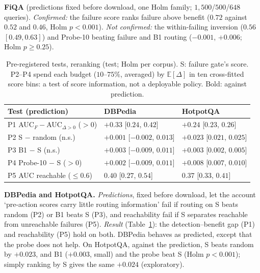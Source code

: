 \documentclass[sigconf,anonymous,review]{acmart}
\begin{document}
\textbf{FiQA} (predictions fixed before download, one Holm family;
$1{,}500$/$500$/$648$ queries). \emph{Confirmed:} the failure score
ranks failure above benefit ($0.72$ against $0.52$ and $0.46$, Holm
$p<0.001$). \emph{Not confirmed:} the within-failing inversion ($0.56$
$[0.49,0.63]$) and Probe-10 beating failure and B1 routing ($-0.001$,
$+0.006$; Holm $p\ge0.25$).

\begin{table}[t]
\caption{Pre-registered tests, reranking (test; Holm per corpus). S:
failure gate's score. P2--P4 spend each budget ($10$--$75\%$,
averaged) by $\mathbb{E}[\Delta]$ in ten cross-fitted score bins: a
test of score information, not a deployable policy. Bold: against
prediction.}
\label{tab:iv}
\footnotesize
\setlength{\tabcolsep}{3pt}
\begin{tabular}{@{}lll@{}}
\toprule
Test (prediction) & DBPedia & HotpotQA \\
\midrule
P1 AUC$_F-$AUC$_{\Delta>0}$ ($>0$) & $+0.33$ [$0.24$, $0.42$] & $+0.24$ [$0.23$, $0.26$] \\
P2 S $-$ random (n.s.) & $+0.001$ [$-0.002$, $0.013$] & $\mathbf{+0.023}$ [$0.021$, $0.025$] \\
P3 B1 $-$ S (n.s.) & $+0.003$ [$-0.009$, $0.011$] & $\mathbf{+0.003}$ [$0.002$, $0.005$] \\
P4 Probe-10 $-$ S ($>0$) & $\mathbf{+0.002}$ [$-0.009$, $0.011$] & $+0.008$ [$0.007$, $0.010$] \\
P5 AUC reachable ($\le0.6$) & $0.40$ [$0.27$, $0.54$] & $0.37$ [$0.33$, $0.41$] \\
\bottomrule
\end{tabular}
\end{table}

\textbf{DBPedia and HotpotQA.} \emph{Predictions}, fixed before
download, let the
account `pre-action scores carry little routing information' fail if
routing on S beats random (P2) or B1 beats S (P3), and reachability
fail if S separates reachable from unreachable failures (P5). \emph{Result} (Table~\ref{tab:iv}): the
detection--benefit gap (P1) and reachability (P5) hold on both.
DBPedia behaves as predicted, except that the probe does not help. On
HotpotQA, against the prediction, S beats random by $+0.023$, and B1
($+0.003$, small) and the probe beat S (Holm $p<0.001$); simply
ranking by S gives the same $+0.024$ (exploratory).
\end{document}
